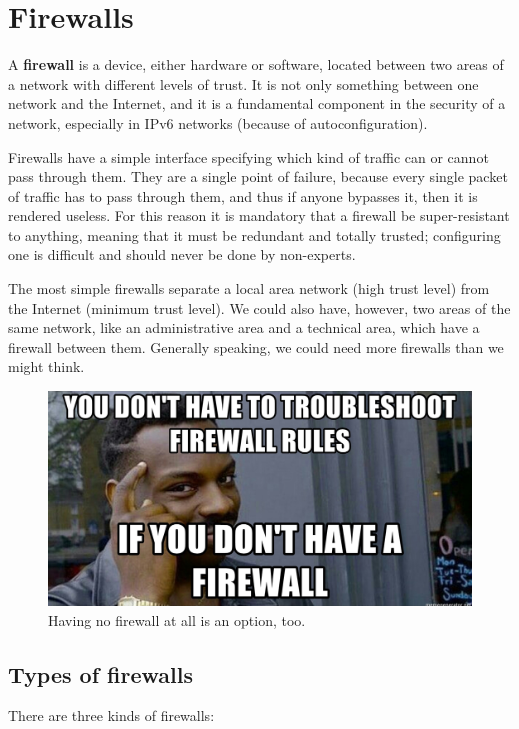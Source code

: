 \chapter{Firewalls}
\label{ch:firewall}
A \textbf{firewall} is a device, either hardware or software, located between two areas of a network with different levels of trust. It is not only something between one network and the Internet, and it is a fundamental component in the security of a network, especially in IPv6 networks (because of autoconfiguration).

Firewalls have a simple interface specifying which kind of traffic can or cannot pass through them. They are a single point of failure, because every single packet of traffic has to pass through them, and thus if anyone bypasses it, then it is rendered useless. For this reason it is mandatory that a firewall be super-resistant to anything, meaning that it must be redundant and totally trusted; configuring one is difficult and should never be done by non-experts.

The most simple firewalls separate a local area network (high trust level) from the Internet (minimum trust level). We could also have, however, two areas of the same network, like an administrative area and a technical area, which have a firewall between them. Generally speaking, we could need more firewalls than we might think.

\begin{figure}[h]
    \centering
    \includegraphics[scale=0.3]{img/fw_rules_meme.jpg}
    \decoRule
    \caption{Having no firewall at all is an option, too.}
    \label{fig:fw_rules_meme}
\end{figure}


\section{Types of firewalls}
There are three kinds of firewalls:

